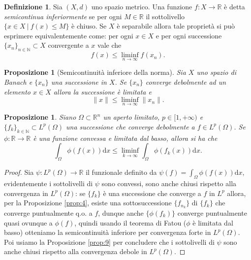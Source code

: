 \documentclass[a4paper,11pt]{book}
\theoremstyle{plain}
\newtheorem{prop}[teo]{Proposizione}
\theoremstyle{definition}
\newtheorem{defn}{Definizione}[chapter]
\theoremstyle{remark}
\newcommand{\R}{\mathbb{R}}
\newcommand{\N}{\mathbb{N}}
\newcommand{\norm}[1]{\lVert#1\rVert}
\newcommand{\dx}{\text{d}x}
\begin{document}
\begin{defn}
	Sia $(X,d)$ uno spazio metrico. Una funzione $f:X\to\R$ è detta \textit{semicontinua inferiormente} se per ogni $M\in\R$ il sottolivello $\{x\in X\ |\ f(x)\leq M\}$ è chiuso. Se $X$ è separabile allora tale proprietà si può esprimere equivalentemente come: per ogni $x\in X$ e per ogni successione $\{x_{n}\}_{n\in\N}\subset X$ convergente a $x$ vale che
	\[
		f(x)\leq \liminf_{n\to\infty}f(x_{n}).
	\]
\end{defn}
\begin{prop}[Semicontinuità inferiore della norma]\label{prop:7}
	Sia $X$ uno spazio di Banach e $\{x_{n}\}$ una successione in $X$. Se $\{x_{n}\}$ converge debolmente ad un elemento $x\in X$ allora la successione è limitata e
	\[
		\norm{x}\leq \liminf_{n\to\infty}\norm{x_{n}}.
	\]
\end{prop}
\begin{prop}\label{prop:6}
	Siano $\Omega\subset\R^{n}$ un aperto limitato, $p{\in}[1,+\infty)$ e $\{f_{k}\}_{k\in\N}\subset L^{p}(\Omega)$ una successione che converge debolmente a $f\in L^{p}(\Omega)$. Se $\phi:\R\to\R$ è una funzione convessa e limitata dal basso, allora si ha che
	\[
		\int_{\Omega}\phi(f(x))\dx \leq \liminf_{k\to\infty}\int_{\Omega}\phi(f_{k}(x))\dx.
	\]
\end{prop}

\begin{proof}
	Sia $\psi:L^{p}(\Omega)\to \R$ il funzionale definito da $\psi(f) = \int_{\Omega}\phi(f(x))\dx$, evidentemente i sottolivelli di $\psi$ sono convessi, sono anche chiusi rispetto alla convergenza in $L^{p}(\Omega)$: se $\{f_{k}\}$ è una successione che converge a $f$ in $L^{p}$ allora, per la Proposizione \ref{prop:4}, esiste una sottosuccessione $\{f_{n_{k}}\}$ di $\{f_{k}\}$ che converge puntualmente q.o. a $f$, dunque anche $\{\phi(f_{k})\}$ converge puntualmente quasi ovunque a $\phi(f)$, quindi usando il teorema di Fatou ($\phi$ è limitata dal basso) otteniamo la semicontinuità inferiore per convergenza forte in $L^{p}(\Omega)$. Poi usiamo la Proposizione \ref{prop:9} per concludere che i sottolivelli di $\psi$ sono anche chiusi rispetto alla convergenza debole in $L^{p}(\Omega)$.
\end{proof}
\end{document}
